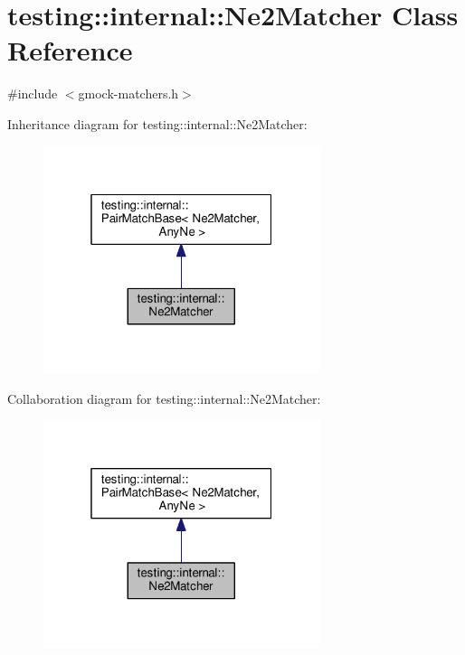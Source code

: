 \hypertarget{classtesting_1_1internal_1_1Ne2Matcher}{}\section{testing\+:\+:internal\+:\+:Ne2\+Matcher Class Reference}
\label{classtesting_1_1internal_1_1Ne2Matcher}


{\ttfamily \#include $<$gmock-\/matchers.\+h$>$}



Inheritance diagram for testing\+:\+:internal\+:\+:Ne2\+Matcher\+:
\nopagebreak
\begin{figure}[H]
\begin{center}
\leavevmode
\includegraphics[width=229pt]{classtesting_1_1internal_1_1Ne2Matcher__inherit__graph}
\end{center}
\end{figure}


Collaboration diagram for testing\+:\+:internal\+:\+:Ne2\+Matcher\+:
\nopagebreak
\begin{figure}[H]
\begin{center}
\leavevmode
\includegraphics[width=229pt]{classtesting_1_1internal_1_1Ne2Matcher__coll__graph}
\end{center}
\end{figure}

